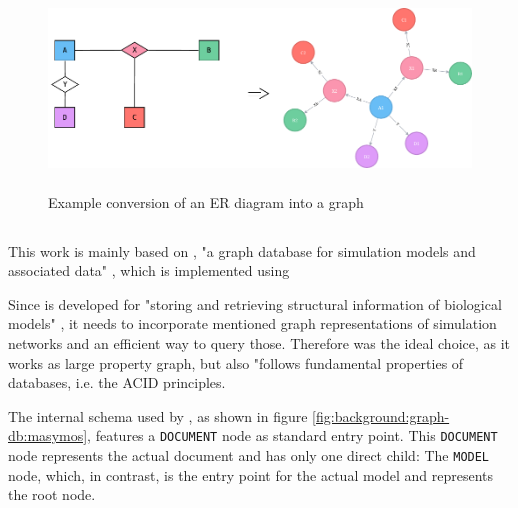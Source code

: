 \begin{figure}
	\center
	\includegraphics[height=150pt]{resources/er-to-neo4j.pdf}
	\caption{Example conversion of an ER diagram into a \neoj graph}
	
	
	\label{fig:example-er-diagram}
\end{figure}

\subsection{\masymos}
\label{sec:background:graph-db:masymos}

This work is mainly based on \masymos, "a graph database for simulation models and associated data" \citep{Henkel2015}, which is implemented using \neoj \citep{Robinson2013}

Since \masymos is developed for "storing and retrieving structural information of biological models" \citep{Henkel2015}, it needs to incorporate mentioned graph representations of simulation networks and an efficient way to query those. Therefore \neoj was the ideal choice, as it works as large property graph, but also "follows fundamental properties of databases, i.e. the ACID principles. \citep{Henkel2015}

The internal schema used by \masymos, as shown in figure \ref{fig:background:graph-db:masymos}, features a \texttt{DOCUMENT} node as standard entry point. This \texttt{DOCUMENT} node represents the actual \xml document and has only one direct child: The \texttt{MODEL} node, which, in contrast, is the entry point for the actual model and represents the \xml root node.

